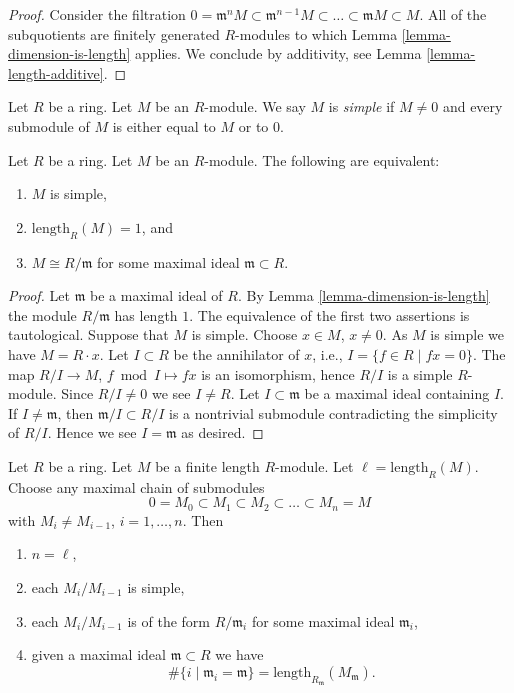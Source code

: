 \begin{proof}
Consider the filtration
$0 = \mathfrak m^n M \subset
\mathfrak m^{n-1} M \subset
\ldots \subset \mathfrak m M \subset M$.
All of the subquotients are finitely generated $R$-modules
to which Lemma \ref{lemma-dimension-is-length} applies. We conclude
by additivity, see Lemma \ref{lemma-length-additive}.
\end{proof}

\begin{definition}
\label{definition-simple-module}
Let $R$ be a ring. Let $M$ be an $R$-module.
We say $M$ is {\it simple} if $M \not = 0$ and
every submodule of $M$ is either equal to $M$ or
to $0$.
\end{definition}

\begin{lemma}
\label{lemma-characterize-length-1}
Let $R$ be a ring. Let $M$ be an $R$-module.
The following are equivalent:
\begin{enumerate}
\item $M$ is simple,
\item $\text{length}_R(M) = 1$, and
\item $M \cong R/\mathfrak m$ for some maximal ideal
$\mathfrak m \subset R$.
\end{enumerate}
\end{lemma}

\begin{proof}
Let $\mathfrak m$ be a maximal ideal of $R$.
By Lemma \ref{lemma-dimension-is-length} the module
$R/\mathfrak m$ has length $1$. The equivalence of
the first two assertions is tautological.
Suppose that $M$ is simple. Choose $x \in M$, $x \not = 0$.
As $M$ is simple we have $M = R \cdot x$.
Let $I \subset R$ be the annihilator of $x$, i.e.,
$I = \{f \in R \mid fx = 0\}$. The map $R/I \to M$,
$f \bmod I \mapsto fx$ is an isomorphism, hence
$R/I$ is a simple $R$-module. Since $R/I \not = 0$ we see $I \not = R$.
Let $I \subset \mathfrak m$ be a maximal ideal containing $I$.
If $I \not = \mathfrak m$, then $\mathfrak m /I \subset R/I$
is a nontrivial submodule contradicting the simplicity
of $R/I$. Hence we see $I = \mathfrak m$ as desired.
\end{proof}

\begin{lemma}
\label{lemma-simple-pieces}
Let $R$ be a ring. Let $M$ be a finite length $R$-module.
Let $\ell = \text{length}_R(M)$. Choose any maximal chain of
submodules
$$
0 = M_0 \subset M_1 \subset M_2 \subset \ldots \subset M_n = M
$$
with $M_i \not = M_{i-1}$, $i = 1, \ldots, n$. Then
\begin{enumerate}
\item $n = \ell$,
\item each $M_i/M_{i-1}$ is simple,
\item each $M_i/M_{i-1}$ is of the form
$R/\mathfrak m_i$ for some maximal ideal $\mathfrak m_i$,
\item given a maximal ideal $\mathfrak m \subset R$
we have
$$
\# \{i \mid \mathfrak m_i = \mathfrak m\}
=
\text{length}_{R_{\mathfrak m}} (M_{\mathfrak m}).
$$
\end{enumerate}
\end{lemma}


